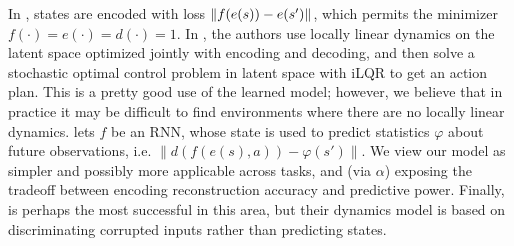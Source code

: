 \documentclass{report}
\begin{document}
In \cite{munk2016learning}, states are encoded with loss $\lVert f(e(s)) - e(s')\rVert$, which permits the minimizer $f(\cdot)=e(\cdot) = d(\cdot) = 1$. In \cite{watter2015embed}, the authors use locally linear dynamics on the latent space optimized jointly with encoding and decoding, and then solve a stochastic optimal control problem in latent space with iLQR to get an action plan. This is a pretty good use of the learned model; however, we believe that in practice it may be difficult to find environments where there are no locally linear dynamics. \cite{venkatraman2017predictive} lets $f$ be an RNN, whose state is used to predict statistics $\varphi$ about future observations, i.e. $\|d(f(e(s), a)) - \varphi(s')\|$. We view our model as simpler and possibly more applicable across tasks, and (via $\alpha$) exposing the tradeoff between encoding reconstruction accuracy and predictive power. Finally, \cite{shelhamer2016loss} is perhaps the most successful in this area, but their dynamics model is based on discriminating corrupted inputs rather than predicting states.



\end{document}
